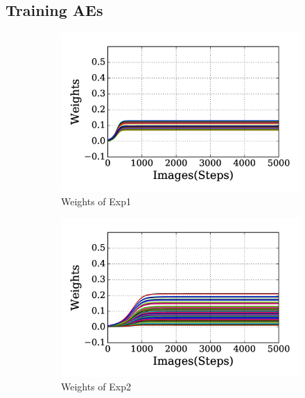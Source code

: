 \subsection[AEs]{Training AEs}
\label{subsec:exp_AE}
\begin{figure}
	\centering
	\begin{subfigure}[t]{0.48\textwidth}
		\includegraphics[width=\textwidth]{pics_sdlm/20_exp_AE/exp1_weights_non.png}
		\caption{Weights of Exp1}
	\end{subfigure}
	\begin{subfigure}[t]{0.48\textwidth}
		\includegraphics[width=\textwidth]{pics_sdlm/20_exp_AE/exp2_weights_non.png}
		\caption{Weights of Exp2}
	\end{subfigure}
	\begin{subfigure}[t]{0.48\textwidth}

\end{subfigure}
\end{figure}
